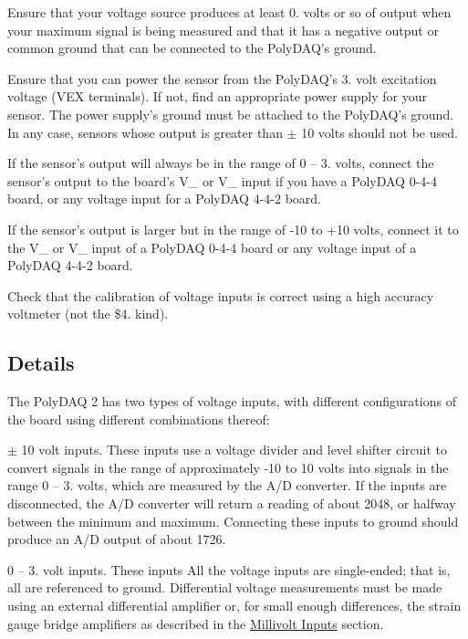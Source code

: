\begin{DoxyEnumerate}
\item Ensure that your voltage source produces at least 0. volts or so of output when your maximum signal is being measured and that it has a negative output or common ground that can be connected to the Poly\-D\-A\-Q's ground.
\item Ensure that you can power the sensor from the Poly\-D\-A\-Q's 3. volt excitation voltage ({\ttfamily V\-E\-X} terminals). If not, find an appropriate power supply for your sensor. The power supply's ground must be attached to the Poly\-D\-A\-Q's ground. In any case, sensors whose output is greater than $\pm$ 10 volts should not be used.
\item If the sensor's output will always be in the range of 0 -- 3. volts, connect the sensor's output to the board's {\ttfamily V\-\_} or {\ttfamily V\-\_} input if you have a Poly\-D\-A\-Q 0-\/4-\/4 board, or any voltage input for a Poly\-D\-A\-Q 4-\/4-\/2 board.
\item If the sensor's output is larger but in the range of -\/10 to +10 volts, connect it to the {\ttfamily V\-\_} or {\ttfamily V\-\_} input of a Poly\-D\-A\-Q 0-\/4-\/4 board or any voltage input of a Poly\-D\-A\-Q 4-\/4-\/2 board.
\item Check that the calibration of voltage inputs is correct using a high accuracy voltmeter (not the \$4. kind).
\end{DoxyEnumerate}\hypertarget{pd_sensors_ss_vin_det}{}\subsection{Details}\label{pd_sensors_ss_vin_det}
The Poly\-D\-A\-Q 2 has two types of voltage inputs, with different configurations of the board using different combinations thereof\-:
\begin{DoxyItemize}
\item  $\pm$ 10 volt inputs. These inputs use a voltage divider and level shifter circuit to convert signals in the range of approximately -\/10 to 10 volts into signals in the range 0 -- 3. volts, which are measured by the A/\-D converter. If the inputs are disconnected, the A/\-D converter will return a reading of about 2048, or halfway between the minimum and maximum. Connecting these inputs to ground should produce an A/\-D output of about 1726.
\item 0 -- 3. volt inputs. These inputs All the voltage inputs are single-\/ended; that is, all are referenced to ground. Differential voltage measurements must be made using an external differential amplifier or, for small enough differences, the strain gauge bridge amplifiers as described in the \hyperlink{pd_sensors_sec_mV}{Millivolt Inputs} section.
\end{DoxyItemize}

